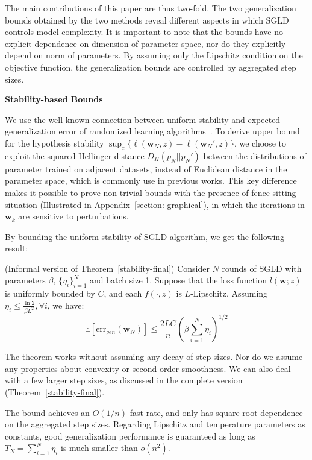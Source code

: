 \documentclass[final,12pt]{colt2018} %
\newcommand{\w}{\bm{w}}
\begin{document}
The main contributions of this paper are thus two-fold. The two generalization bounds obtained by the two methods reveal different aspects in which SGLD controls model complexity. It is important to note that the bounds have no explicit dependence on dimension of parameter space, nor do they explicitly depend on norm of parameters. By assuming only the Lipschitz condition on the objective function, the generalization bounds are controlled by aggregated step sizes.

 \vspace{0.1cm}
\noindent\textbf{Stability-based Bounds}

We use the well-known connection between uniform stability and expected generalization error of randomized learning algorithms~\citep{elisseeff2005stability}. To derive upper bound for the hypothesis stability $\sup_{z}\{\ell(\bm{w}_N,z)- \ell(\bm{w}_N',z)\}$, we choose to exploit the squared Hellinger distance $D_H(p_N||p_N')$ between the distributions of parameter trained on adjacent datasets, instead of Euclidean distance in the parameter space, which is commonly use in previous works. This key difference makes it possible to prove non-trivial bounds with the presence of fence-sitting situation (Illustrated in Appendix~\ref{section: graphical}), in which the iterations in $\w_k$ are sensitive to perturbations.

By bounding the uniform stability of SGLD algorithm, we get the following result:
\begin{theorem}
  \label{stability-simplified} (Informal version of Theorem~\ref{stability-final})
  Consider $N$ rounds of SGLD with parameters $\beta$, $\{\eta_i\}_{i=1}^N$ and batch size 1. Suppose that the loss function $l(\bm{w};z)$ is uniformly bounded by $C$, and each $f(\cdot,z)$ is $L$-Lipschitz. Assuming $\eta_i\leq \frac{\ln 2}{\beta L^2},\forall i$, we have:
  \begin{equation}
  \mathbb{E}[\mathrm{err}_{gen}(\bm{w}_N)]\leq \frac{2LC}{n}\left(\beta\sum\limits_{i=1}^N \eta_i\right)^{1/2}
  \end{equation}
\end{theorem}
  The theorem works without assuming any decay of step sizes. Nor do we assume any properties about convexity or second order smoothness. We can also deal with a few larger step sizes, as discussed in the complete version (Theorem~\ref{stability-final}).

  The bound achieves an $O(1/n)$ fast rate, and only has square root dependence on the aggregated step sizes. Regarding Lipschitz and temperature parameters as constants, good generalization performance is guaranteed as long as $T_N=\sum_{i=1}^N\eta_i$ is much smaller than $o(n^2)$.
  \vspace{0.1cm}
\end{document}
